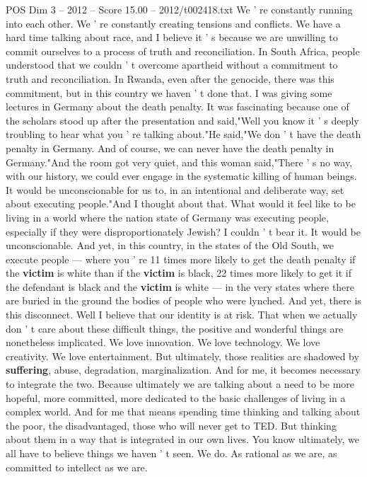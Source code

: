 \begin{textsample}{POS Dim 3 – 2012 – Score 15.00 – 2012/t002418.txt}
We ' re constantly running into each other.
We ' re constantly creating tensions and conflicts.
We have a hard time talking about race, and I believe it ' s because we are unwilling to commit ourselves to a process of truth and reconciliation.
In South Africa, people understood that we couldn ' t overcome apartheid without a commitment to truth and reconciliation.
In Rwanda, even after the genocide, there was this commitment, but in this country we haven ' t done that.
I was giving some lectures in Germany about the death penalty.
It was fascinating because one of the scholars stood up after the presentation and said,"Well you know it ' s deeply troubling to hear what you ' re talking about."He said,"We don ' t have the death penalty in Germany.
And of course, we can never have the death penalty in Germany."And the room got very quiet, and this woman said,"There ' s no way, with our history, we could ever engage in the systematic killing of human beings.
It would be unconscionable for us to, in an intentional and deliberate way, set about executing people."And I thought about that.
What would it feel like to be living in a world where the nation state of Germany was executing people, especially if they were disproportionately Jewish?
I couldn ' t bear it.
It would be unconscionable.
And yet, in this country, in the states of the Old South, we execute people — where you ' re 11 times more likely to get the death penalty if the \textbf{victim} is white than if the \textbf{victim} is black, 22 times more likely to get it if the defendant is black and the \textbf{victim} is white — in the very states where there are buried in the ground the bodies of people who were lynched.
And yet, there is this disconnect.
Well I believe that our identity is at risk.
That when we actually don ' t care about these difficult things, the positive and wonderful things are nonetheless implicated.
We love innovation.
We love technology.
We love creativity.
We love entertainment.
But ultimately, those realities are shadowed by \textbf{suffering}, abuse, degradation, marginalization.
And for me, it becomes necessary to integrate the two.
Because ultimately we are talking about a need to be more hopeful, more committed, more dedicated to the basic challenges of living in a complex world.
And for me that means spending time thinking and talking about the poor, the disadvantaged, those who will never get to TED.
But thinking about them in a way that is integrated in our own lives.
You know ultimately, we all have to believe things we haven ' t seen.
We do.
As rational as we are, as committed to intellect as we are.

\end{textsample}
